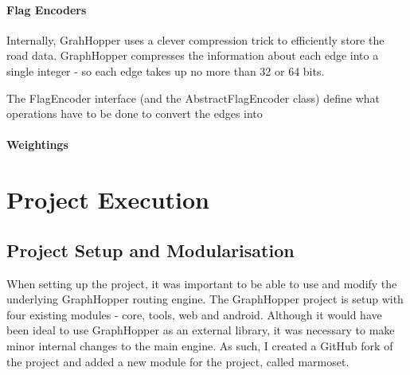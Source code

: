 \documentclass[ draft,
                    author={Alexander Hill},
                supervisor={Dr. Benjamin Sach},
                    degree={MEng},
                     title={MARMOSET: Multi Agent Real-time Multi-core Online
                     Simulation for Efficient Transportation},
                  subtitle={},
                      type={research},
                      year={2016} ]{dissertation}
\begin{document}
\subsubsection{Flag Encoders}

Internally, GrahHopper uses a clever compression trick to efficiently store
the road data. GraphHopper compresses the information about each edge into a
single integer - so each edge takes up no more than 32 or 64 bits.

The FlagEncoder interface (and the AbstractFlagEncoder class) define what
operations have to be done to convert the edges into

\subsubsection{Weightings}


\chapter{Project Execution}
\label{chap:execution}





\section{Project Setup and Modularisation}

When setting up the project, it was important to be able to use and modify the
underlying GraphHopper routing engine. The GraphHopper project is setup with
four existing modules - core, tools, web and android. Although it would have
been ideal to use GraphHopper as an external library, it was necessary to make
minor internal changes to the main engine. As such, I created a GitHub fork of
the project and added a new module for the project, called marmoset.
\end{document}

